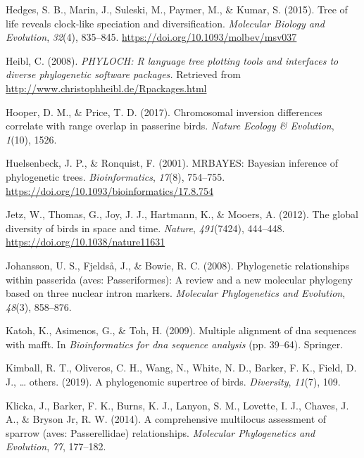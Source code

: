 \documentclass[english,man]{apa6}
\begin{document}
\leavevmode\hypertarget{ref-Hedges2015}{}%
Hedges, S. B., Marin, J., Suleski, M., Paymer, M., \& Kumar, S. (2015). Tree of life reveals clock-like speciation and diversification. \emph{Molecular Biology and Evolution}, \emph{32}(4), 835--845. \url{https://doi.org/10.1093/molbev/msv037}

\leavevmode\hypertarget{ref-Heibl2008}{}%
Heibl, C. (2008). \emph{PHYLOCH: R language tree plotting tools and interfaces to diverse phylogenetic software packages.} Retrieved from \url{http://www.christophheibl.de/Rpackages.html}

\leavevmode\hypertarget{ref-hooper2017chromosomal}{}%
Hooper, D. M., \& Price, T. D. (2017). Chromosomal inversion differences correlate with range overlap in passerine birds. \emph{Nature Ecology \& Evolution}, \emph{1}(10), 1526.

\leavevmode\hypertarget{ref-Huelsenbeck2001}{}%
Huelsenbeck, J. P., \& Ronquist, F. (2001). MRBAYES: Bayesian inference of phylogenetic trees. \emph{Bioinformatics}, \emph{17}(8), 754--755. \url{https://doi.org/10.1093/bioinformatics/17.8.754}

\leavevmode\hypertarget{ref-Jetz2012}{}%
Jetz, W., Thomas, G., Joy, J. J., Hartmann, K., \& Mooers, A. (2012). The global diversity of birds in space and time. \emph{Nature}, \emph{491}(7424), 444--448. \url{https://doi.org/10.1038/nature11631}

\leavevmode\hypertarget{ref-johansson2008phylogenetic}{}%
Johansson, U. S., Fjeldså, J., \& Bowie, R. C. (2008). Phylogenetic relationships within passerida (aves: Passeriformes): A review and a new molecular phylogeny based on three nuclear intron markers. \emph{Molecular Phylogenetics and Evolution}, \emph{48}(3), 858--876.

\leavevmode\hypertarget{ref-katoh2009multiple}{}%
Katoh, K., Asimenos, G., \& Toh, H. (2009). Multiple alignment of dna sequences with mafft. In \emph{Bioinformatics for dna sequence analysis} (pp. 39--64). Springer.

\leavevmode\hypertarget{ref-kimball2019phylogenomic}{}%
Kimball, R. T., Oliveros, C. H., Wang, N., White, N. D., Barker, F. K., Field, D. J., \ldots{} others. (2019). A phylogenomic supertree of birds. \emph{Diversity}, \emph{11}(7), 109.

\leavevmode\hypertarget{ref-klicka2014comprehensive}{}%
Klicka, J., Barker, F. K., Burns, K. J., Lanyon, S. M., Lovette, I. J., Chaves, J. A., \& Bryson Jr, R. W. (2014). A comprehensive multilocus assessment of sparrow (aves: Passerellidae) relationships. \emph{Molecular Phylogenetics and Evolution}, \emph{77}, 177--182.
\end{document}
